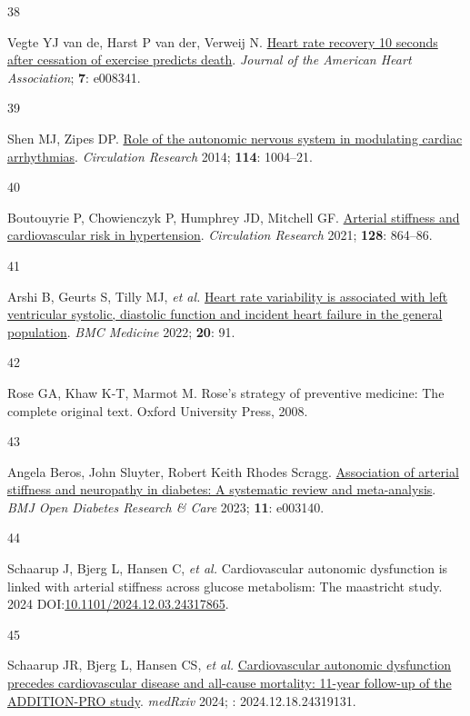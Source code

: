 \documentclass[
  a4paper,
  headsepline=true,
  open=any]{scrbook}
\newlength{\cslhangindent}
\newlength{\csllabelwidth}
\newlength{\cslentryspacingunit} %
\newenvironment{CSLReferences}[2] %
 {%
  \setlength{\parindent}{0pt}
  \ifodd #1
  \let\oldpar\par
  \def\par{\hangindent=\cslhangindent\oldpar}
  \fi
  \setlength{\parskip}{#2\cslentryspacingunit}
 }%
 {}
\newcommand{\CSLLeftMargin}[1]{\parbox[t]{\csllabelwidth}{#1}}
\newcommand{\CSLRightInline}[1]{\parbox[t]{\linewidth - \csllabelwidth}{#1}\break}
\begin{document}
\begin{CSLReferences}{0}{0}
\leavevmode{}%
\CSLLeftMargin{38 }%
\CSLRightInline{Vegte YJ van de, Harst P van der, Verweij N.
\href{https://doi.org/10.1161/JAHA.117.008341}{Heart rate recovery 10
seconds after cessation of exercise predicts death}. \emph{Journal of
the American Heart Association}; \textbf{7}: e008341.}

\leavevmode{}%
\CSLLeftMargin{39 }%
\CSLRightInline{Shen MJ, Zipes DP.
\href{https://doi.org/10.1161/CIRCRESAHA.113.302549}{Role of the
autonomic nervous system in modulating cardiac arrhythmias}.
\emph{Circulation Research} 2014; \textbf{114}: 1004--21.}

\leavevmode{}%
\CSLLeftMargin{40 }%
\CSLRightInline{Boutouyrie P, Chowienczyk P, Humphrey JD, Mitchell GF.
\href{https://doi.org/10.1161/CIRCRESAHA.121.318061}{Arterial stiffness
and cardiovascular risk in hypertension}. \emph{Circulation Research}
2021; \textbf{128}: 864--86.}

\leavevmode{}%
\CSLLeftMargin{41 }%
\CSLRightInline{Arshi B, Geurts S, Tilly MJ, \emph{et al.}
\href{https://doi.org/10.1186/s12916-022-02273-9}{Heart rate variability
is associated with left ventricular systolic, diastolic function and
incident heart failure in the general population}. \emph{BMC Medicine}
2022; \textbf{20}: 91.}

\leavevmode{}%
\CSLLeftMargin{42 }%
\CSLRightInline{Rose GA, Khaw K-T, Marmot M. Rose's strategy of
preventive medicine: The complete original text. Oxford University
Press, 2008.}

\leavevmode{}%
\CSLLeftMargin{43 }%
\CSLRightInline{Angela Beros, John Sluyter, Robert Keith Rhodes Scragg.
\href{https://doi.org/10.1136/bmjdrc-2022-003140}{Association of
arterial stiffness and neuropathy in diabetes: A systematic review and
meta-analysis}. \emph{BMJ Open Diabetes Research \& Care} 2023;
\textbf{11}: e003140.}

\leavevmode{}%
\CSLLeftMargin{44 }%
\CSLRightInline{Schaarup J, Bjerg L, Hansen C, \emph{et al.}
Cardiovascular autonomic dysfunction is linked with arterial stiffness
across glucose metabolism: The maastricht study. 2024
DOI:\href{https://doi.org/10.1101/2024.12.03.24317865}{10.1101/2024.12.03.24317865}.}

\leavevmode{}%
\CSLLeftMargin{45 }%
\CSLRightInline{Schaarup JR, Bjerg L, Hansen CS, \emph{et al.}
\href{https://doi.org/10.1101/2024.12.18.24319131}{Cardiovascular
autonomic dysfunction precedes cardiovascular disease and all-cause
mortality: 11-year follow-up of the ADDITION-PRO study}. \emph{medRxiv}
2024; : 2024.12.18.24319131.}


\end{CSLReferences}
\end{document}
